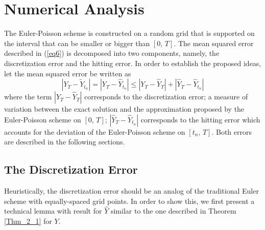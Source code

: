 \chapter{Numerical Analysis}
The Euler-Poisson scheme is constructed on a random grid that is supported on the interval that can be smaller or bigger than $[0, \, T]$. The mean squared error described in (\ref{eq6}) is decomposed into two components, namely, the discretization error and the hitting error. In order to establish the proposed ideas, let the mean squared error be written as
\begin{equation}\label{eq10}
    |Y_T - \tilde{Y}_{t_n}| = |Y_T - \hat{Y}_{t_n}| \leq |Y_T - \hat{Y}_{T}| +    |\hat{Y}_{T} - \hat{Y}_{t_n} |
\end{equation}
where the term $|Y_T - \hat{Y}_{T}|$ corresponds to the discretization error; a measure of variation between the exact solution and the approximation proposed by the Euler-Poisson scheme on $[0, \, T]$; $|\hat{Y}_{T} - \hat{Y}_{t_n}|$ corresponds to the hitting error which accounts for the deviation of the Euler-Poisson scheme on $[t_n, \, T]$. Both errors are described in the following sections.

\section{The Discretization Error}
Heuristically, the discretization error should be an analog of the traditional Euler scheme with equally-spaced grid points. In order to show this, we first present a technical lemma with result for $\hat{Y}$ similar to the one described in Theorem \ref{Thm_2_1}  for $Y$.

